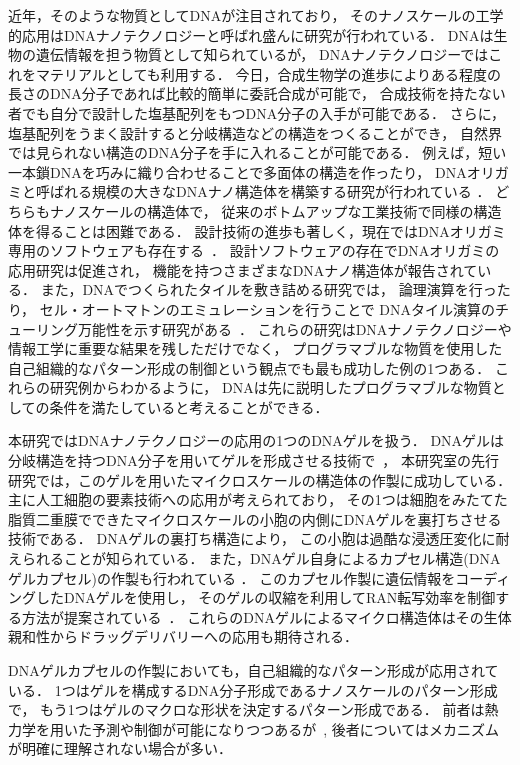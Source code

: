 近年，そのような物質としてDNAが注目されており，
そのナノスケールの工学的応用はDNAナノテクノロジーと呼ばれ盛んに研究が行われている．
DNAは生物の遺伝情報を担う物質として知られているが，
DNAナノテクノロジーではこれをマテリアルとしても利用する．
今日，合成生物学の進歩によりある程度の長さのDNA分子であれば比較的簡単に委託合成が可能で，
合成技術を持たない者でも自分で設計した塩基配列をもつDNA分子の入手が可能である．
さらに，塩基配列をうまく設計すると分岐構造などの構造をつくることができ，
自然界では見られない構造のDNA分子を手に入れることが可能である．
例えば，短い一本鎖DNAを巧みに織り合わせることで多面体の構造を作ったり\cite{chen1991synthesis}，
DNAオリガミと呼ばれる規模の大きなDNAナノ構造体を構築する研究が行われている
\cite{rothemund2006folding}．
どちらもナノスケールの構造体で，
従来のボトムアップな工業技術で同様の構造体を得ることは困難である．
設計技術の進歩も著しく，現在ではDNAオリガミ専用のソフトウェアも存在する~\cite{douglas2009rapid}．
設計ソフトウェアの存在でDNAオリガミの応用研究は促進され，
機能を持つさまざまなDNAナノ構造体が報告されている．
また，DNAでつくられたタイルを敷き詰める研究では\cite{winfree1998design}，
論理演算を行ったり\cite{mao2000logical}，
セル・オートマトンのエミュレーションを行うことで
DNAタイル演算のチューリング万能性を示す研究がある~\cite{rothemund2004algorithmic}．
これらの研究はDNAナノテクノロジーや情報工学に重要な結果を残しただけでなく，
プログラマブルな物質を使用した自己組織的なパターン形成の制御という観点でも最も成功した例の1つある．
これらの研究例からわかるように，
DNAは先に説明したプログラマブルな物質としての条件を満たしていると考えることができる．

本研究ではDNAナノテクノロジーの応用の1つのDNAゲルを扱う．
DNAゲルは分岐構造を持つDNA分子を用いてゲルを形成させる技術で~\cite{um2006enzyme}，
本研究室の先行研究では，このゲルを用いたマイクロスケールの構造体の作製に成功している．
主に人工細胞の要素技術への応用が考えられており，
その1つは細胞をみたてた脂質二重膜でできたマイクロスケールの小胞の内側にDNAゲルを裏打ちさせる技術である．
DNAゲルの裏打ち構造により，
この小胞は過酷な浸透圧変化に耐えられることが知られている\cite{kurokawa2017dna}．
また，DNAゲル自身によるカプセル構造(DNAゲルカプセル)の作製も行われている
\cite{morita2017formation}．
このカプセル作製に遺伝情報をコーディングしたDNAゲルを使用し，
そのゲルの収縮を利用してRAN転写効率を制御する方法が提案されている~\cite{watanabe}．
これらのDNAゲルによるマイクロ構造体はその生体親和性からドラッグデリバリーへの応用も期待される．

DNAゲルカプセルの作製においても，自己組織的なパターン形成が応用されている．
1つはゲルを構成するDNA分子形成であるナノスケールのパターン形成で，
もう1つはゲルのマクロな形状を決定するパターン形成である．
前者は熱力学を用いた予測や制御が可能になりつつあるが~\cite{zadeh2011nupack}, 
後者についてはメカニズムが明確に理解されない場合が多い．


